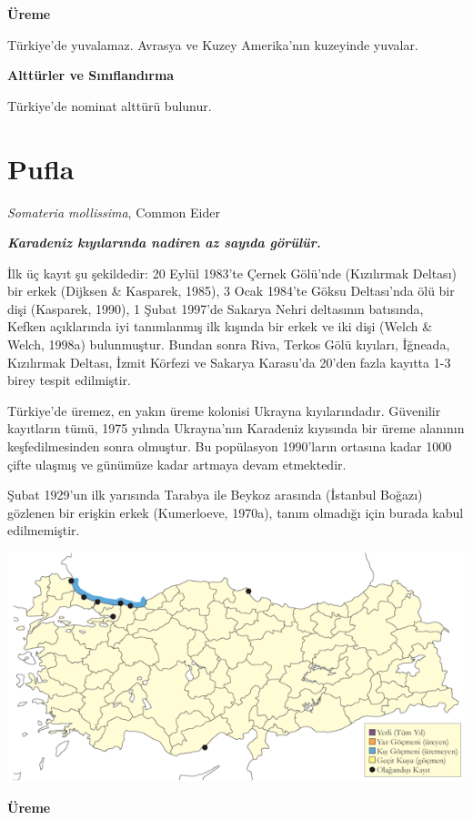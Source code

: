 \documentclass[
  a4paper,
  DIV=11,
  numbers=noendperiod]{scrreprt}
\begin{document}
\textbf{Üreme}

Türkiye'de yuvalamaz. Avrasya ve Kuzey Amerika'nın kuzeyinde yuvalar.

\textbf{Alttürler ve Sınıflandırma}

Türkiye'de nominat alttürü bulunur.

\section{Pufla}\label{pufla}

\emph{Somateria mollissima}, Common Eider

\textbf{\emph{Karadeniz kıyılarında nadiren az sayıda görülür.}}

İlk üç kayıt şu şekildedir: 20 Eylül 1983'te Çernek Gölü'nde (Kızılırmak
Deltası) bir erkek (Dijksen \& Kasparek, 1985), 3 Ocak 1984'te Göksu
Deltası'nda ölü bir dişi (Kasparek, 1990), 1 Şubat 1997'de Sakarya Nehri
deltasının batısında, Kefken açıklarında iyi tanımlanmış ilk kışında bir
erkek ve iki dişi (Welch \& Welch, 1998a) bulunmuştur. Bundan sonra
Riva, Terkos Gölü kıyıları, İğneada, Kızılırmak Deltası, İzmit Körfezi
ve Sakarya Karasu'da 20'den fazla kayıtta 1-3 birey tespit edilmiştir.

Türkiye'de üremez, en yakın üreme kolonisi Ukrayna kıyılarındadır.
Güvenilir kayıtların tümü, 1975 yılında Ukrayna'nın Karadeniz kıyısında
bir üreme alanının keşfedilmesinden sonra olmuştur. Bu popülasyon
1990'ların ortasına kadar 1000 çifte ulaşmış ve günümüze kadar artmaya
devam etmektedir.

Şubat 1929'un ilk yarısında Tarabya ile Beykoz arasında (İstanbul
Boğazı) gözlenen bir erişkin erkek (Kumerloeve, 1970a), tanım olmadığı
için burada kabul edilmemiştir.

\includegraphics{images/harita_Page_027.png}

\textbf{Üreme}
\end{document}
